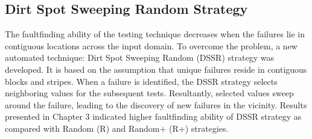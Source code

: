 \subsection{Dirt Spot Sweeping Random Strategy}

The faultfinding ability of the testing technique decreases when the failures lie in contiguous locations across the input domain. To overcome the problem, a new automated technique: Dirt Spot Sweeping Random (DSSR) strategy was developed. It is based on the assumption that unique failures reside in contiguous blocks and stripes. When a failure is identified, the DSSR strategy selects neighboring values for the subsequent tests. Resultantly, selected values sweep around the failure, leading to the discovery of new failures in the vicinity. Results presented in Chapter 3 indicated higher faultfinding ability of DSSR strategy as compared with Random (R) and Random+ (R+) strategies.

